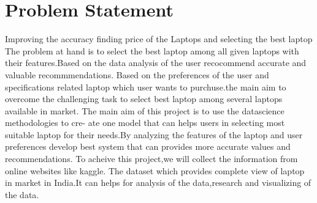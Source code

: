 \section{Problem Statement}
Improving the accuracy finding price of the Laptops and selecting the best laptop The problem at hand is
to select the best laptop among all given laptops with their features.Based on the data analysis of the user
recocommend accurate and valuable recommmendations. Based on the preferences of the user and specifications
related laptop which user wants to purchuse.the main aim to overcome the challenging task to select best laptop
among several laptops available in market.
The main aim of this project is to use the datascience methodologies to cre- ate one model that can helps users
in selecting most suitable laptop for their needs.By analyzing the features of the laptop and user preferences
develop best system that can provides more accurate values and recommendations.
To acheive this project,we will collect the information from online websites like kaggle. The dataset which
provides complete view of laptop in market in India.It can helps for analysis of the data,research and visualizing of the data.












